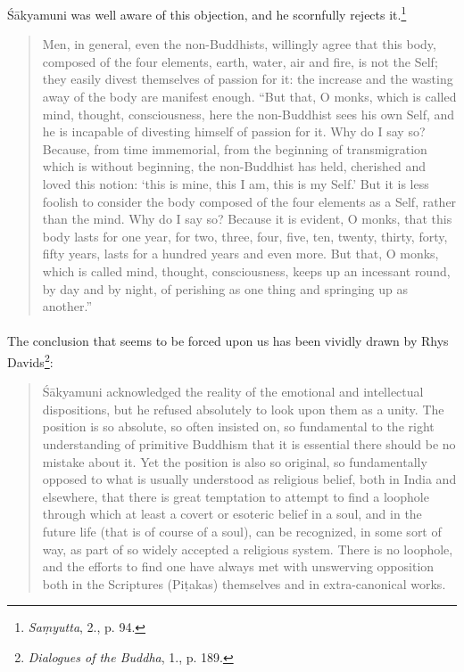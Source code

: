 \documentclass[a4paper, 11pt, oneside, english]{article}
\begin{document}
Śākyamuni was well aware of this objection, and he scornfully rejects it.\footnote{\emph{Saṃyutta}, 2., p. 94.}
\begin{quotation}
\small
Men, in general, even the non-Buddhists, willingly agree that this body, composed of the four elements, earth, water, air and fire, is not the Self; they easily divest themselves of passion for it: the increase and the wasting away of the body are manifest enough. ``But that, O monks, which is called mind, thought, consciousness, here the non-Buddhist sees his own Self, and he is incapable of divesting himself of passion for it. Why do I say so? Because, from time immemorial, from the beginning of transmigration which is without beginning, the non-Buddhist has held, cherished and loved this notion: `this is mine, this I am, this is my Self.' But it is less foolish to consider the body composed of the four elements as a Self, rather than the mind. Why do I say so? Because it is evident, O monks, that this body lasts for one year, for two, three, four, five, ten, twenty, thirty, forty, fifty years, lasts for a hundred years and even more. But that, O monks, which is called mind, thought, consciousness, keeps up an incessant round, by day and by night, of perishing as one thing and springing up as another.''
\end{quotation}
\paragraph{}
The conclusion that seems to be forced upon us has been vividly drawn by Rhys Davids\footnote{\emph{Dialogues of the Buddha}, 1., p. 189.}:
\begin{quotation}
\small
Śākyamuni acknowledged the reality of the emotional and intellectual dispositions, but he refused absolutely to look upon them as a unity. The position is so absolute, so often insisted on, so fundamental to the right understanding of primitive Buddhism that it is essential there should be no mistake about it. Yet the position is also so original, so fundamentally opposed to what is usually understood as religious belief, both in India and elsewhere, that there is great temptation to attempt to find a loophole through which at least a covert or esoteric belief in a soul, and in the future life (that is of course of a soul), can be recognized, in some sort of way, as part of so widely accepted a religious system. There is no loophole, and the efforts to find one have always met with unswerving opposition both in the Scriptures (Piṭakas) themselves and in extra-canonical works.
\end{quotation}
\end{document}
